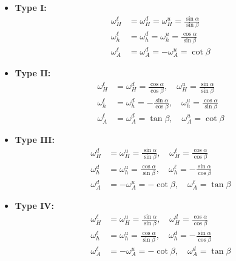 \documentclass[12pt,oneside]{book}
\begin{document}
\begin{itemize}
    \item[] \bfseries{Type I}:
        \begin{align}
            \omega^{\ell}_H &= \omega^{d}_H = \omega^{u}_H = \frac{\sin{\alpha}}{\sin{\beta}} \\ \nonumber
            \omega^{\ell}_h &= \omega^{d}_h = \omega^{u}_h = \frac{\cos{\alpha}}{\sin{\beta}} \\ \nonumber
            \omega^{\ell}_A &= \omega^{d}_A = - \omega^{u}_A = \cot{\beta}
        \end{align}

    \item[] \bfseries{Type II}:
        \begin{align}
            \omega^{\ell}_H &= \omega^{d}_H = \frac{\cos{\alpha}}{\cos{\beta}}, \quad  \omega^{u}_H = \frac{\sin{\alpha}}{\sin{\beta}} \\ \nonumber
            \omega^{\ell}_h &= \omega^{d}_h = -\frac{\sin{\alpha}}{\cos{\beta}}, \quad  \omega^{u}_h = \frac{\cos{\alpha}}{\sin{\beta}} \\ \nonumber
            \omega^{\ell}_A &= \omega^{d}_A = \tan{\beta}, \quad  \omega^{u}_A = \cot{\beta}
        \end{align}

    \item[] \bfseries{Type III}:
        \begin{align}
            \omega^{d}_H &= \omega^{u}_H = \frac{\sin{\alpha}}{\sin{\beta}}, \quad  \omega^{\ell}_H = \frac{\cos{\alpha}}{\cos{\beta}} \\ \nonumber
            \omega^{d}_h &= \omega^{u}_h = \frac{\cos{\alpha}}{\sin{\beta}}, \quad  \omega^{\ell}_h = -\frac{\sin{\alpha}}{\cos{\beta}} \\ \nonumber
            \omega^{d}_A &= -\omega^{u}_A = -\cot{\beta}, \quad  \omega^{\ell}_A = \tan{\beta}
        \end{align}

    \item[] \bfseries{Type IV}:
        \begin{align}
            \omega^{\ell}_H &= \omega^{u}_H = \frac{\sin{\alpha}}{\sin{\beta}}, \quad  \omega^{d}_H = \frac{\cos{\alpha}}{\cos{\beta}} \\ \nonumber
            \omega^{\ell}_h &= \omega^{u}_h = \frac{\cos{\alpha}}{\sin{\beta}}, \quad  \omega^{d}_h = -\frac{\sin{\alpha}}{\cos{\beta}} \\ \nonumber
            \omega^{\ell}_A &= -\omega^{u}_A = -\cot{\beta}, \quad  \omega^{d}_A = \tan{\beta}
        \end{align}
\end{itemize}
\end{document}
